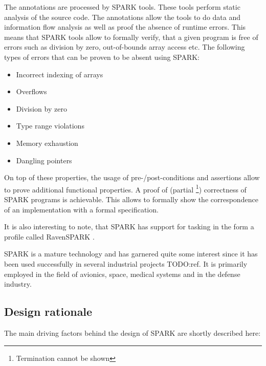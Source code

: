 The annotations are processed by SPARK tools. These tools perform static
analysis of the source code. The annotations allow the tools to do data and
information flow analysis as well as proof the absence of runtime errors. This
means that SPARK tools allow to formally verify, that a given program is free
of errors such as division by zero, out-of-bounds array access etc. The
following types of errors that can be proven to be absent using SPARK:

\begin{itemize}
	\item Incorrect indexing of arrays
	\item Overflows
	\item Division by zero
	\item Type range violations
	\item Memory exhaustion
	\item Dangling pointers
\end{itemize}

On top of these properties, the usage of pre-/post-conditions and assertions
allow to prove additional functional properties. A proof of (partial
\footnote{Termination cannot be shown}) correctness of SPARK programs is
achievable. This allows to formally show the correspondence of an implementation
with a formal specification.

It is also interesting to note, that SPARK has support for tasking in the form a
profile called RavenSPARK \cite{RavenSPARK}.

SPARK is a mature technology and has garnered quite some interest since it has
been used successfully in several industrial projects TODO:ref. It is primarily
employed in the field of avionics, space, medical systems and in the defense
industry.

\subsection{Design rationale}
The main driving factors behind the design of SPARK are shortly described here:

